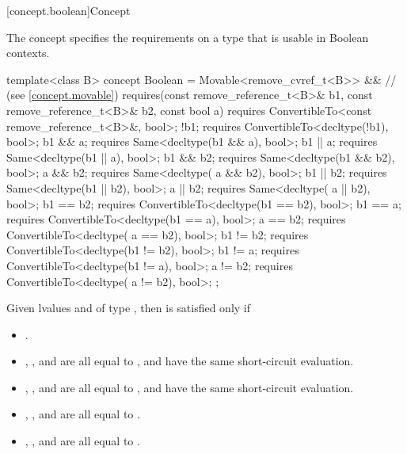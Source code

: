 [concept.boolean]{Concept }

\pnum
The  concept specifies the requirements on a type that is
usable in Boolean contexts.

%
\begin{itemdecl}
template<class B>
concept Boolean = Movable<remove_cvref_t<B>> && // (see \ref{concept.movable})
  requires(const remove_reference_t<B>& b1,
           const remove_reference_t<B>& b2, const bool a) {
    requires ConvertibleTo<const remove_reference_t<B>&, bool>;
    !b1;      requires ConvertibleTo<decltype(!b1), bool>;
    b1 &&  a; requires Same<decltype(b1 &&  a), bool>;
    b1 ||  a; requires Same<decltype(b1 ||  a), bool>;
    b1 && b2; requires Same<decltype(b1 && b2), bool>;
     a && b2; requires Same<decltype( a && b2), bool>;
    b1 || b2; requires Same<decltype(b1 || b2), bool>;
     a || b2; requires Same<decltype( a || b2), bool>;
    b1 == b2; requires ConvertibleTo<decltype(b1 == b2), bool>;
    b1 ==  a; requires ConvertibleTo<decltype(b1 ==  a), bool>;
     a == b2; requires ConvertibleTo<decltype( a == b2), bool>;
    b1 != b2; requires ConvertibleTo<decltype(b1 != b2), bool>;
    b1 !=  a; requires ConvertibleTo<decltype(b1 !=  a), bool>;
     a != b2; requires ConvertibleTo<decltype( a != b2), bool>;
  };
\end{itemdecl}

\pnum
Given lvalues  and  of type
,
then  is satisfied only if

\begin{itemize}
\item {}.
\item {}, , and
       are all equal to
      , and have the same short-circuit
      evaluation.
\item {}, , and
       are all equal to
      , and have the same short-circuit
      evaluation.
\item {}, , and
       are all equal to
      .
\item {}, , and
       are all equal to
      .
\end{itemize}

